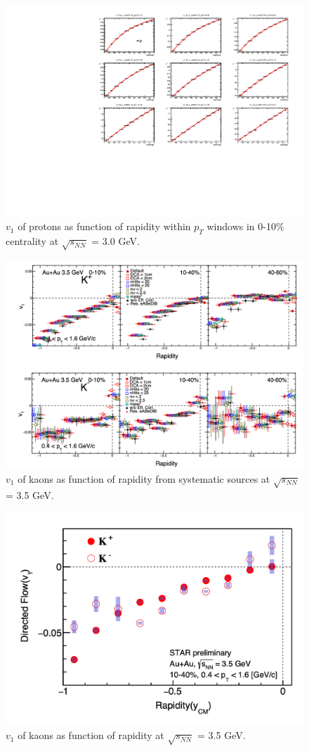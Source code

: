 \begin{figure}[hbt!]
\centering
\includegraphics[width=0.85\linewidth]{figures/chapter03/3gev_protonp_v1VSy_9pT_cent2.pdf}
\caption{$v_1$ of protons as function of rapidity within $p_T$ windows in 0-10\% centrality at $\sqrt{s_{NN}}$ = 3.0 GeV.}
\label{fig:3gev_proton_v1y_pt_cent2}
\end{figure}


\begin{figure}[hbt!]
\centering
\includegraphics[width=0.95\linewidth]{figures/chapter03/3p5gev_kaon_v1y_sysUnc.png}
\caption{$v_1$ of kaons as function of rapidity from systematic sources at $\sqrt{s_{NN}}$ = 3.5 GeV.}
\label{fig:3p5gev_kaon_v1y_sysUnc}
\end{figure}

\begin{figure}[hbt!]
\centering
\includegraphics[width=0.65\linewidth]{figures/chapter03/3p5gev_kaon_v1y.png}
\caption{$v_1$ of kaons as function of rapidity at $\sqrt{s_{NN}}$ = 3.5 GeV.}
\label{fig:3p5gev_kaon_v1y}
\end{figure}

